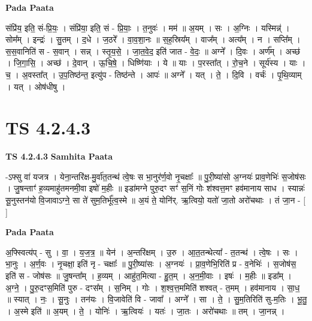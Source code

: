 \documentclass[17pt]{extarticle}
\begin{document}
\textbf{Pada Paata} \newline

संप्रि॑य॒ इति॒ सं-प्रि॒यः॒ । संप्रि॑या॒ इति॒ सं - प्रि॒याः॒ । त॒नुवः॑ । मम॑ ॥ अ॒यम् । सः । अ॒ग्निः । यस्मिन्न्॑ । सोम᳚म् । इन्द्रः॑ । सु॒तम् । द॒धे । ज॒ठरे᳚ । वा॒व॒शा॒नः ॥ स॒ह॒स्रिय᳚म् । वाज᳚म् । अत्य᳚म् । न । सप्ति᳚म् । स॒स॒वानिति॑ स - स॒वान् । सन्न् । स्तृ॒य॒से॒ । जा॒त॒वे॒द॒ इति॑ जात - वे॒दः॒ ॥ अग्ने᳚ । दि॒वः । अर्ण᳚म् । अच्छ॑ । जि॒गा॒सि॒ । अच्छ॑ । दे॒वान् । ऊ॒चि॒षे॒ । धिष्णि॑याः । ये ॥ याः । प॒रस्ता᳚त् । रो॒च॒ने । सूर्य॑स्य । याः । च॒ । अ॒वस्ता᳚त् । उ॒प॒तिष्ठ॑न्त॒ इत्यु॑प - तिष्ठ॑न्ते । आपः॑ ॥ अग्ने᳚ । यत् । ते॒ । दि॒वि । वर्चः॑ । पृ॒थि॒व्याम् । यत् । ओष॑धीषु ।  \newline




\section*{ TS 4.2.4.3 }

\textbf{TS 4.2.4.3 } \newline
\textbf{Samhita Paata} \newline

-ऽफ्सु वा॑ यजत्र । येना॒न्तरि॑क्ष-मु॒र्वा॑त॒तन्थ॑ त्वे॒षः स भा॒नुर॑र्ण॒वो नृ॒चक्षाः᳚ ॥ पु॒री॒ष्या॑सो अ॒ग्नयः॑ प्राव॒णेभिः॑ स॒जोष॑सः । जु॒षन्ताꣳ॑ ह॒व्यमाहु॑तमनमी॒वा इषो॑ म॒हीः ॥ इडा॑मग्ने पुरु॒दꣳ सꣳ॑ स॒निं गोः श॑श्वत्त॒मꣳ हव॑मानाय साध । स्यान्नः॑ सू॒नुस्तन॑यो वि॒जावाऽग्ने॒ सा ते॑ सुम॒तिर्भू᳚त्व॒स्मे ॥ अ॒यं ते॒ योनि॑र्. ऋ॒त्वियो॒ यतो॑ जा॒तो अरो॑चथाः । तं जा॒न - [  ] \newline

\textbf{Pada Paata} \newline

अ॒फ्स्वित्य॑प् - सु । वा॒ । य॒ज॒त्र॒ ॥ येन॑ । अ॒न्तरि॑क्षम् । उ॒रु । आ॒त॒तन्थेत्या᳚ - त॒तन्थ॑ । त्वे॒षः । सः । भा॒नुः । अ॒र्ण॒वः । नृ॒चक्षा॒ इति॑ नृ - चक्षाः᳚ ॥ पु॒री॒ष्या॑सः । अ॒ग्नयः॑ । प्रा॒व॒णेभि॒रिति॑ प्र - व॒नेभिः॑ । स॒जोष॑स॒ इति॑ स - जोष॑सः ॥ जु॒षन्ता᳚म् । ह॒व्यम् । आहु॑त॒मित्या - हु॒त॒म् । अ॒न॒मी॒वाः । इषः॑ । म॒हीः ॥ इडा᳚म् । अ॒ग्ने॒ । पु॒रु॒दꣳस॒मिति॑ पुरु - दꣳस᳚म् । स॒निम् । गोः । श॒श्व॒त्त॒ममिति॑ शश्वत् - त॒मम् । हव॑मानाय । सा॒ध॒ ॥ स्यात् । नः॒ । सू॒नुः । तन॑यः । वि॒जावेति॑ वि - जावा᳚ । अग्ने᳚ । सा । ते॒ । सु॒म॒तिरिति॑ सु-म॒तिः । भू॒तु॒ । अ॒स्मे इति॑ ॥ अ॒यम् । ते॒ । योनिः॑ । ऋ॒त्वियः॑ । यतः॑ । जा॒तः । अरो॑चथाः ॥ तम् । जा॒नन्न् ।  \newline
\end{document}

